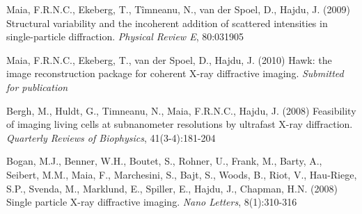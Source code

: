 {\begin{romanlist}
    \item 
      \label{dynamics}
      Maia, F.R.N.C., Ekeberg, T., T\^{i}mneanu, N., van der Spoel, D., Hajdu,
      J. (2009) Structural variability and the incoherent addition of scattered
      intensities in single-particle diffraction. {\em Physical Review E}, 80:031905
      
    \item 
      \label{hawk}
      Maia, F.R.N.C.,  Ekeberg, T., van der Spoel, D., Hajdu, J. (2010)
      Hawk: the image reconstruction package for coherent X-ray diffractive
      imaging. {\em Submitted for publication}
\end{romanlist}

\vspace{1\baselineskip} 

\clearpage 


\vspace{1cm}

\begin{romanlist}
  \setcounter{romanlistc}{5}
\item Bergh, M., Huldt, G., Timneanu, N., Maia, F.R.N.C., Hajdu, J. (2008)
  Feasibility of imaging living cells at subnanometer resolutions by ultrafast
  X-ray diffraction. {\em Quarterly Reviews of Biophysics}, 41(3-4):181-204
  \label{QRB}
\item Bogan, M.J., Benner, W.H., Boutet, S., Rohner, U., Frank, M., Barty, A.,
  Seibert, M.M., Maia, F., Marchesini, S., Bajt, S., Woods, B., Riot, V.,
  Hau-Riege, S.P., Svenda, M., Marklund, E., Spiller, E., Hajdu, J., Chapman,
  H.N. (2008) Single particle X-ray diffractive imaging. {\em Nano Letters},
  8(1):310-316
  \label{nano}
\end{romanlist}
}


\newcommand{\dedication}%
{\cleardoublepage
\thispagestyle{empty}
\vspace*{\stretch{3}}
\begin{flushright}
		
{\fontfamily{pzc}\Large\selectfont\emph{to my grandparents...}}

\end{flushright}
\vspace*{\stretch{1}}} %

